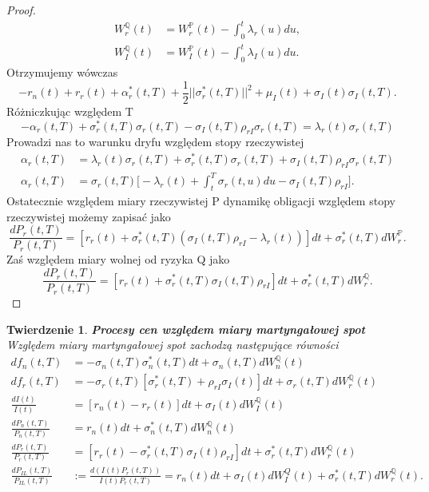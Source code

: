 \documentclass{mini}
\theoremstyle{mythstyle}
\newtheorem{Twierdzenie}{Twierdzenie}[chapter]
\begin{document}
\begin{proof}
\begin{align*}
	W_r^\mathbb{Q}(t) &= W_r^\mathbb{P}(t) - \int_{0}^{t} \lambda_r(u) du, \\
	W_I^\mathbb{Q}(t) &= W_I^\mathbb{P}(t) - \int_{0}^{t} \lambda_I(u) du.
	\end{align*}
	Otrzymujemy wówczas
	\begin{equation}
	-r_n(t) + r_r(t) + \alpha_r^*(t,T) + \frac{1}{2} ||\sigma_r^*(t,T)||^2 + \mu_I(t) + \sigma_I(t)\sigma_I(t,T).
	\end{equation}
	Różniczkując względem T
	\begin{equation}
	-\alpha_r(t,T) + \sigma_r^*(t,T)\sigma_r(t,T)-\sigma_I(t,T)\rho_{rI}\sigma_r(t,T) = \lambda_r(t)\sigma_r(t,T)
	\end{equation}
	Prowadzi nas to warunku dryfu względem stopy rzeczywistej
	\begin{align*}
	\alpha_r(t,T) &= \lambda_r(t)\sigma_r(t,T) + \sigma_r^*(t,T)\sigma_r(t,T)+\sigma_I(t,T)\rho_{rI}\sigma_r(t,T) \\
	\alpha_r(t,T) &= \sigma_r(t,T)\bigg[ -\lambda_r(t) + \int_{t}^{T}\sigma_r(t,u) du - \sigma_I(t,T)\rho_{rI}\bigg].
	\end{align*}
	Ostatecznie względem miary rzeczywistej P dynamikę obligacji względem stopy rzeczywistej możemy zapisać jako
	\begin{equation}
	\frac{dP_r(t,T)}{P_r(t,T)} = [r_r(t) +\sigma^*_r(t,T)(\sigma_I(t,T)\rho_{rI}-\lambda_r(t))]dt + \sigma^*_r(t,T)dW^\mathbb{P}_r.
	\end{equation}
	Zaś względem miary wolnej od ryzyka Q jako
	\begin{equation}
	\frac{dP_r(t,T)}{P_r(t,T)} = [r_r(t) +\sigma^*_r(t,T)\sigma_I(t,T)\rho_{rI}]dt + \sigma^*_r(t,T)dW^\mathbb{Q}_r.
	\end{equation}

		\end{proof}

	\begin{Twierdzenie} \textbf{Procesy cen względem miary martyngałowej spot}\\
	Względem miary martyngałowej spot zachodzą następujące równości
		\begin{align}
		df_n(t,T) &= -\sigma_n(t,T) \sigma^*_n(t,T)dt + \sigma_n(t,T)dW_n^\mathbb{Q}(t) \\
		df_r(t,T) &= -\sigma_r(t,T) [\sigma^*_r(t,T) + \rho_{rI}\sigma_I(t)]dt + \sigma_r(t,T)dW_r^\mathbb{Q}(t)\\
		\frac{dI(t)}{I(t)} &= [r_n(t) - r_r(t)] dt + \sigma_I(t)dW_I^\mathbb{Q}(t)\\
		\frac{dP_n(t,T)}{P_n(t,T)} &= r_n(t)dt + \sigma^*_n(t,T)dW_n^\mathbb{Q}(t)\\
		\frac{dP_r(t,T)}{P_r(t,T)} &= [r_r(t) - \sigma^*_r(t,T)\sigma_I(t)\rho_{rI}]dt + \sigma^*_r(t,T) dW_r^\mathbb{Q}(t)\\
		\frac{dP_{IL}(t,T)}{P_{IL}(t,T)} &:= \frac{d(I(t)P_r(t,T))}{I(t)P_r(t,T)} = r_n(t)dt + \sigma_I(t)dW_I^Q(t) + \sigma^*_r(t,T) dW_r^\mathbb{Q}(t).  
		\end{align}
	\end{Twierdzenie}
\end{document}
